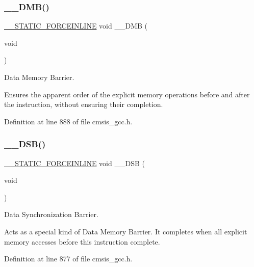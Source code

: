 \subsubsection{\texorpdfstring{\+\_\+\+\_\+\+D\+M\+B()}{\_\_DMB()}}
{\footnotesize\ttfamily \hyperlink{cmsis__iccarm_8h_ab904513442afdf77d4f8c74f23cbb040}{\+\_\+\+\_\+\+S\+T\+A\+T\+I\+C\+\_\+\+F\+O\+R\+C\+E\+I\+N\+L\+I\+NE} void \+\_\+\+\_\+\+D\+MB (\begin{DoxyParamCaption}\item[{void}]{ }\end{DoxyParamCaption})}



Data Memory Barrier. 

Ensures the apparent order of the explicit memory operations before and after the instruction, without ensuring their completion. 

Definition at line 888 of file cmsis\+\_\+gcc.\+h.

\mbox{\label{group___c_m_s_i_s___core___instruction_interface_ga7fe277f5385d23b9c44b2cbda1577ce9}} 
\subsubsection{\texorpdfstring{\+\_\+\+\_\+\+D\+S\+B()}{\_\_DSB()}}
{\footnotesize\ttfamily \hyperlink{cmsis__iccarm_8h_ab904513442afdf77d4f8c74f23cbb040}{\+\_\+\+\_\+\+S\+T\+A\+T\+I\+C\+\_\+\+F\+O\+R\+C\+E\+I\+N\+L\+I\+NE} void \+\_\+\+\_\+\+D\+SB (\begin{DoxyParamCaption}\item[{void}]{ }\end{DoxyParamCaption})}



Data Synchronization Barrier. 

Acts as a special kind of Data Memory Barrier. It completes when all explicit memory accesses before this instruction complete. 

Definition at line 877 of file cmsis\+\_\+gcc.\+h.

\mbox{\label{group___c_m_s_i_s___core___instruction_interface_gae26c2b3961e702aeabc24d4984ebd369}} 
